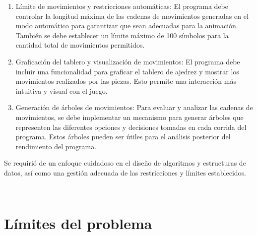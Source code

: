 \begin{enumerate}
    \item Límite de movimientos y restricciones automáticas: El programa debe controlar la longitud máxima de las cadenas de movimientos generadas en el modo automático para garantizar que sean adecuadas para la animación. También se debe establecer un límite máximo de 100 símbolos para la cantidad total de movimientos permitidos.\newline
    
    \item Graficación del tablero y visualización de movimientos: El programa debe incluir una funcionalidad para graficar el tablero de ajedrez y mostrar los movimientos realizados por las piezas. Esto permite una interacción más intuitiva y visual con el juego.\newline
    
    \item Generación de árboles de movimientos: Para evaluar y analizar las cadenas de movimientos, se debe implementar un mecanismo para generar árboles que representen las diferentes opciones y decisiones tomadas en cada corrida del programa. Estos árboles pueden ser útiles para el análisis posterior del rendimiento del programa.
\end{enumerate}

Se requirió de un enfoque cuidadoso en el diseño de algoritmos y estructuras de datos, así como una gestión adecuada de las restricciones y límites establecidos.\newline

\\

\section{Límites del problema}%

